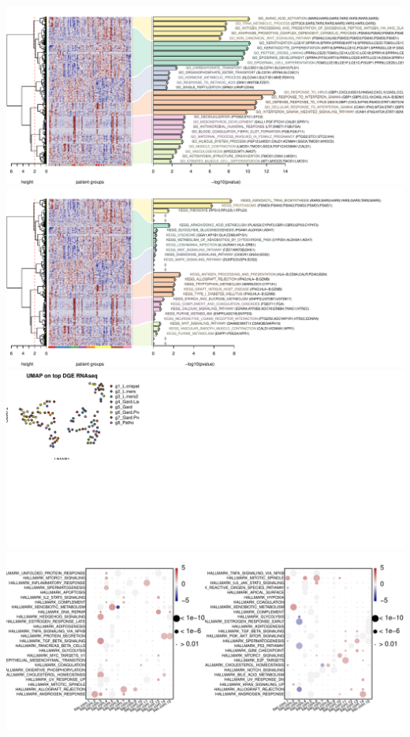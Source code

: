 \documentclass[
]{article}
\begin{document}
\includegraphics[width=1\linewidth]{manuscript_template_files/figure-latex/unnamed-chunk-8-1}
\includegraphics[width=1\linewidth]{manuscript_template_files/figure-latex/unnamed-chunk-8-2}
\includegraphics[width=1\linewidth]{manuscript_template_files/figure-latex/unnamed-chunk-8-3}
\includegraphics[width=1\linewidth]{manuscript_template_files/figure-latex/unnamed-chunk-8-4}
\end{document}
